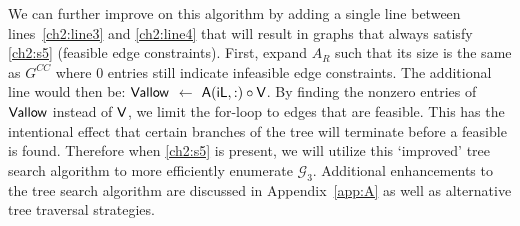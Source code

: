 We can further improve on this algorithm by adding a single line between lines~\ref{ch2:line3} and \ref{ch2:line4} that will result in graphs that always satisfy \ref{ch2:s5} (feasible edge constraints). First, expand $A_R$ such that its size is the same as $G^{CC}$ where 0 entries still indicate infeasible edge constraints. The additional line would then be: $\textup{\textsf{Vallow}}$ $\leftarrow$  $\textup{\textsf{A}}(\textup{\textsf{iL}},:) \circ \textup{\textsf{V}}$. By finding the nonzero entries of $\textup{\textsf{Vallow}}$ instead of $\textup{\textsf{V}}$, we limit the for-loop to edges that are feasible. This has the intentional effect that certain branches of the tree will terminate before a feasible \mypm{} is found. Therefore when \ref{ch2:s5} is present, we will utilize this `improved' tree search algorithm to more efficiently enumerate $\mathcal{G}_3$.
Additional enhancements to the tree search algorithm are discussed in Appendix~\ref{app:A} as well as alternative tree traversal strategies.

